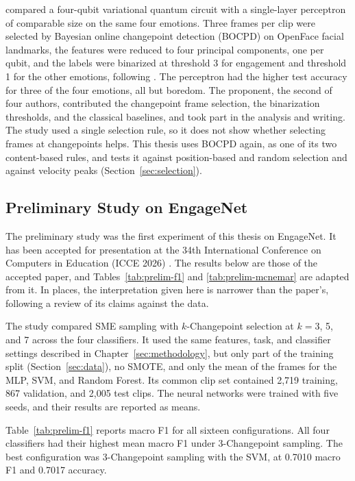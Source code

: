  compared a four-qubit variational quantum circuit with a single-layer perceptron of comparable size on the same four emotions. Three frames per clip were selected by Bayesian online changepoint detection (BOCPD) \cite{adams2007} on OpenFace facial landmarks, the features were reduced to four principal components, one per qubit, and the labels were binarized at threshold 3 for engagement and threshold 1 for the other emotions, following . The perceptron had the higher test accuracy for three of the four emotions, all but boredom. The proponent, the second of four authors, contributed the changepoint frame selection, the binarization thresholds, and the classical baselines, and took part in the analysis and writing. The study used a single selection rule, so it does not show whether selecting frames at changepoints helps. This thesis uses BOCPD again, as one of its two content-based rules, and tests it against position-based and random selection and against velocity peaks (Section~\ref{sec:selection}).

\subsection{Preliminary Study on EngageNet}
\label{sec:prelim}

The preliminary study was the first experiment of this thesis on EngageNet. It has been accepted for presentation at the 34th International Conference on Computers in Education (ICCE 2026) \cite{sityar2026icce}. The results below are those of the accepted paper, and Tables~\ref{tab:prelim-f1} and \ref{tab:prelim-mcnemar} are adapted from it. In places, the interpretation given here is narrower than the paper's, following a review of its claims against the data.

The study compared SME sampling with $k$-Changepoint selection at $k = 3$, 5, and 7 across the four classifiers. It used the same features, task, and classifier settings described in Chapter~\ref{sec:methodology}, but only part of the training split (Section~\ref{sec:data}), no SMOTE, and only the mean of the frames for the MLP, SVM, and Random Forest. Its common clip set contained 2,719 training, 867 validation, and 2,005 test clips. The neural networks were trained with five seeds, and their results are reported as means.

Table~\ref{tab:prelim-f1} reports macro F1 for all sixteen configurations. All four classifiers had their highest mean macro F1 under 3-Changepoint sampling. The best configuration was 3-Changepoint sampling with the SVM, at 0.7010 macro F1 and 0.7017 accuracy.

